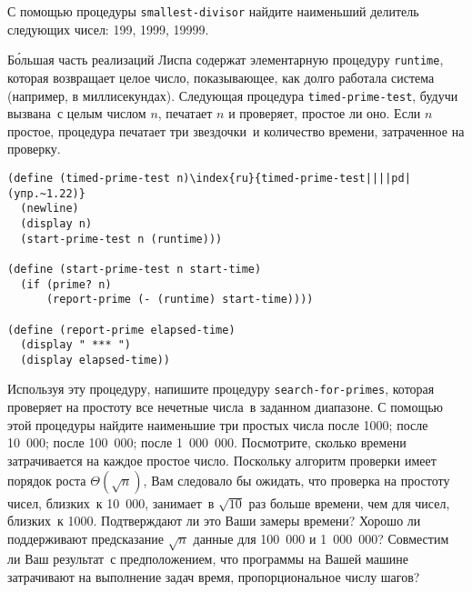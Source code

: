 \begin{exercise}{1.21}\label{EX1.21}%
С помощью процедуры {\tt smallest-divisor}
найдите наименьший делитель следующих чисел: 199, 1999, 19999.
\end{exercise}
\begin{exercise}{1.22}\label{EX1.22}%
Б\'{о}льшая часть реализаций Лиспа содержат элементарную
процедуру 
{\tt runtime}, которая возвращает целое число,
показывающее, как долго работала система (например, в
миллисекундах). Следующая процедура {\tt timed-prime-test},
будучи вызвана~с целым числом $n$, печатает $n$
и проверяет, простое ли оно. Если $n$ простое, процедура
печатает три звездочки~и количество времени, затраченное на проверку.

\begin{Verbatim}[fontsize=\small]
(define (timed-prime-test n)\index{ru}{timed-prime-test||||pd|(упр.~1.22)}
  (newline)
  (display n)
  (start-prime-test n (runtime)))

(define (start-prime-test n start-time)
  (if (prime? n)
      (report-prime (- (runtime) start-time))))

(define (report-prime elapsed-time)
  (display " *** ")
  (display elapsed-time))
\end{Verbatim}
Используя эту процедуру, напишите процедуру
{\tt search-for-primes}, которая проверяет на простоту
все нечетные числа~в заданном диапазоне. С помощью этой процедуры
найдите наименьшие три простых числа после 1000; после 10~000; после
100~000; после 1~000~000.  Посмотрите, сколько времени затрачивается на
каждое простое число.  Поскольку алгоритм проверки имеет порядок роста 
$\Theta (\sqrt{n})$, Вам следовало бы ожидать, что проверка 
на простоту чисел, близких~к 10~000, занимает~в $\sqrt{10}$
раз больше времени, чем для чисел, близких~к 1000.  Подтверждают ли
это Ваши замеры времени? Хорошо ли поддерживают предсказание
$\sqrt{n}$ данные для 100~000 и 1~000~000?  Совместим ли
Ваш результат~с предположением, что программы на Вашей машине
затрачивают на выполнение задач время, пропорциональное числу шагов?
\end{exercise}

